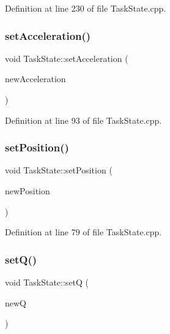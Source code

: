 Definition at line 230 of file Task\+State.\+cpp.

\hypertarget{classocra_1_1TaskState_ab408a5c4b442ac5ad3f5d50fec1aefdb}{}\label{classocra_1_1TaskState_ab408a5c4b442ac5ad3f5d50fec1aefdb} 
\subsubsection{\texorpdfstring{set\+Acceleration()}{setAcceleration()}}
{\footnotesize\ttfamily void Task\+State\+::set\+Acceleration (\begin{DoxyParamCaption}\item[{const Eigen\+::\+Twistd \&}]{new\+Acceleration }\end{DoxyParamCaption})}



Definition at line 93 of file Task\+State.\+cpp.

\hypertarget{classocra_1_1TaskState_a4107e9ca574e2baa40add4d993d3c01f}{}\label{classocra_1_1TaskState_a4107e9ca574e2baa40add4d993d3c01f} 
\subsubsection{\texorpdfstring{set\+Position()}{setPosition()}}
{\footnotesize\ttfamily void Task\+State\+::set\+Position (\begin{DoxyParamCaption}\item[{const Eigen\+::\+Displacementd \&}]{new\+Position }\end{DoxyParamCaption})}



Definition at line 79 of file Task\+State.\+cpp.

\hypertarget{classocra_1_1TaskState_a2a1821ebe86ba99e305debf366ce77f1}{}\label{classocra_1_1TaskState_a2a1821ebe86ba99e305debf366ce77f1} 
\subsubsection{\texorpdfstring{set\+Q()}{setQ()}}
{\footnotesize\ttfamily void Task\+State\+::setQ (\begin{DoxyParamCaption}\item[{const Eigen\+::\+Vector\+Xd \&}]{newQ }\end{DoxyParamCaption})}



